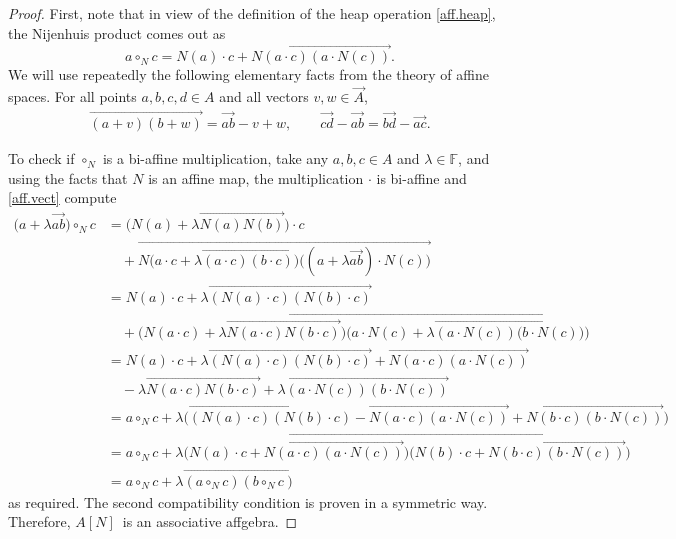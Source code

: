 \documentclass[pdftex]{sigma}
\numberwithin{equation}{section}
\newcommand{\F}{\mathbb F}
\begin{document}
\begin{proof}
First, note that in view of the definition of the heap operation \eqref{aff.heap}, the Nijenhuis product comes out as
\[
a\circ_Nc = N(a)\cdot c + \overrightarrow{N(a\cdot c)(a\cdot N(c))}.
\]
 We will use repeatedly the following elementary facts from the theory of affine spaces. For all points $a,b,c,d\in A$ and all vectors $v,w\in \vec{A}$,
 \begin{gather}\label{aff.vect}
 \overrightarrow{(a+v)(b+w)} = \overrightarrow{ab}-v +w, \qquad \overrightarrow{cd} - \overrightarrow{ab} = \overrightarrow{bd} - \overrightarrow{ac} .
 \end{gather}

To check if $\circ_N$ is a bi-affine multiplication, take any $a,b,c\in A$ and $\lambda\in \F$, and using the facts that $N$ is an affine map, the multiplication $\cdot$ is bi-affine and \eqref{aff.vect} compute
\begin{align*}
 \bigl(a+\lambda \overrightarrow{ab}\bigr)\circ_N  c &= \bigl(N(a) + \lambda\overrightarrow{N(a)N(b)}\bigr)\cdot c
 \\
 &\quad+\overrightarrow{N\big(a\cdot c+\lambda\overrightarrow{(a\cdot c)(b\cdot c)}\big)\big((a+\lambda \overrightarrow{ab})\cdot N(c)\big)}\\
 &= N(a)\cdot c + \lambda \overrightarrow{(N(a)\cdot c)(N(b)\cdot c)} \\
 &\quad
 +
 \overrightarrow{\big(N(a\cdot c)+\lambda \overrightarrow{N(a\cdot c)N(b\cdot c)}\big)\big(a\cdot N(c)+\lambda \overrightarrow{(a\cdot N(c))(b\cdot N(c)})\big)}\\
 &= N(a)\cdot c + \lambda \overrightarrow{(N(a)\cdot c)(N(b)\cdot c)} + \overrightarrow{N(a\cdot c)(a\cdot N(c))}\\
 &\quad - \lambda \overrightarrow{N(a\cdot c)N(b\cdot c)} +
 \lambda \overrightarrow{(a\cdot N(c))(b\cdot N(c))}\\
 &= a\circ_N c+ \lambda \big(\overrightarrow{(N(a)\cdot c)(N(b)\cdot c)} - \overrightarrow{N(a\cdot c)(a\cdot N(c))} +
 \overrightarrow{N(b\cdot c)(b\cdot N(c))}\big)\\
 &= a\circ_N c + \lambda \overrightarrow{\big(N(a)\cdot c+ \overrightarrow{ N(a\cdot c)(a\cdot N(c))} \big)\big(N(b)\cdot c+
 \overrightarrow{N(b\cdot c)(b\cdot N(c))}\big)}\\
 &= a\circ_N c + \lambda \overrightarrow{(a\circ_N c)(b\circ_N c)}
\end{align*}
as required. The second compatibility condition is proven in a symmetric way. Therefore, $A[N]$~is an associative affgebra.


\end{proof}
\end{document}
